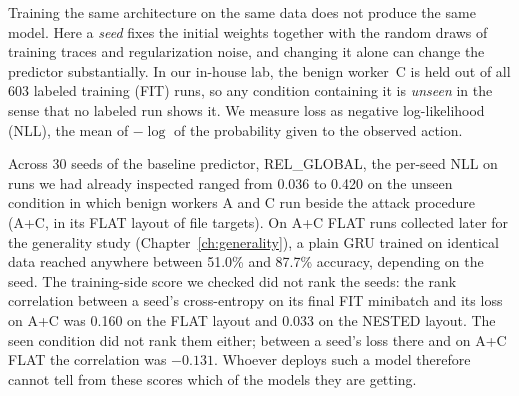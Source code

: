 Training the same architecture on the same data does not produce the
same model. Here a \emph{seed} fixes the initial weights together with
the random draws of training traces and regularization noise, and
changing it alone can change the predictor substantially. In our
in-house lab, the benign worker~C is held out of all 603
labeled training (FIT) runs, so any condition containing it is
\emph{unseen} in the sense that no labeled run shows it. We measure
loss as negative log-likelihood (NLL), the mean of $-\log$ of the
probability given to the observed action.

Across 30 seeds of the baseline predictor, REL\_GLOBAL, the per-seed NLL on runs
we had already inspected ranged from 0.036 to 0.420 on the unseen
condition in which benign workers A and C run beside the attack
procedure (A+C, in its FLAT layout of file targets). On A+C FLAT runs
collected later for the generality study (Chapter~\ref{ch:generality}),
a plain GRU trained on identical data reached anywhere between 51.0\%
and 87.7\% accuracy, depending on the seed. The training-side score we checked did not rank the seeds: the
rank correlation between a seed's cross-entropy on its final FIT
minibatch and its loss on A+C was 0.160 on the FLAT layout and 0.033 on
the NESTED layout. The seen condition did not rank them either; between
a seed's loss there and on A+C FLAT the correlation was $-0.131$.
Whoever deploys such a model therefore cannot tell from these scores
which of the models they are getting.

